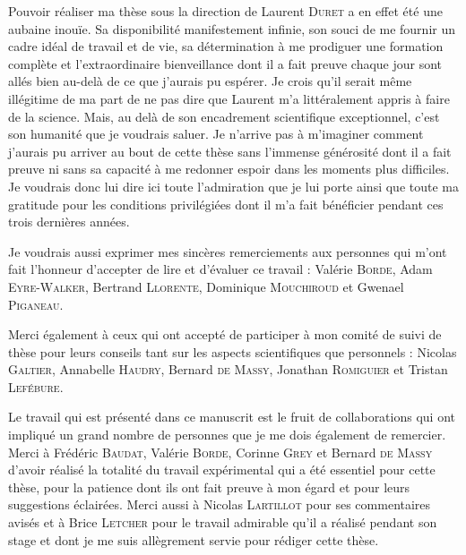 Pouvoir réaliser ma thèse sous la direction de Laurent \textsc{Duret} a en effet été une aubaine inouïe.
Sa disponibilité manifestement infinie, son souci de me fournir un cadre idéal de travail et de vie, sa détermination à me prodiguer une formation complète et l'extraordinaire bienveillance dont il a fait preuve chaque jour sont allés bien au-delà de ce que j'aurais pu espérer.
Je crois qu'il serait même illégitime de ma part de ne pas dire que Laurent m'a littéralement appris à faire de la science.
Mais, au delà de son encadrement scientifique exceptionnel, c'est son humanité que je voudrais saluer.
Je n'arrive pas à m'imaginer comment j'aurais pu arriver au bout de cette thèse sans l'immense générosité dont il a fait preuve ni sans sa capacité à me redonner espoir dans les moments plus difficiles.
Je voudrais donc lui dire ici toute l'admiration que je lui porte ainsi que toute ma gratitude pour les conditions privilégiées dont il m'a fait bénéficier pendant ces trois dernières années.

Je voudrais aussi exprimer mes sincères remerciements aux personnes qui m'ont fait l'honneur d'accepter de lire et d'évaluer ce travail : Valérie \textsc{Borde}, Adam \textsc{Eyre-Walker}, Bertrand \textsc{Llorente}, Dominique \textsc{Mouchiroud} et Gwenael \textsc{Piganeau}.

Merci également à ceux qui ont accepté de participer à mon comité de suivi de thèse pour leurs conseils tant sur les aspects scientifiques que personnels : 
Nicolas \textsc{Galtier},
Annabelle \textsc{Haudry},
Bernard \textsc{de Massy},
Jonathan \textsc{Romiguier} et
Tristan \textsc{Lefébure}.


Le travail qui est présenté dans ce manuscrit est le fruit de collaborations qui ont impliqué un grand nombre de personnes que je me dois également de remercier.
Merci à Frédéric \textsc{Baudat}, Valérie \textsc{Borde}, Corinne \textsc{Grey} et Bernard \textsc{de Massy} d'avoir réalisé la totalité du travail expérimental qui a été essentiel pour cette thèse, pour la patience dont ils ont fait preuve à mon égard et pour leurs suggestions éclairées.
Merci aussi à Nicolas \textsc{Lartillot} pour ses commentaires avisés et à Brice \textsc{Letcher} pour le travail admirable qu'il a réalisé pendant son stage et dont je me suis allègrement servie pour rédiger cette thèse.\\



